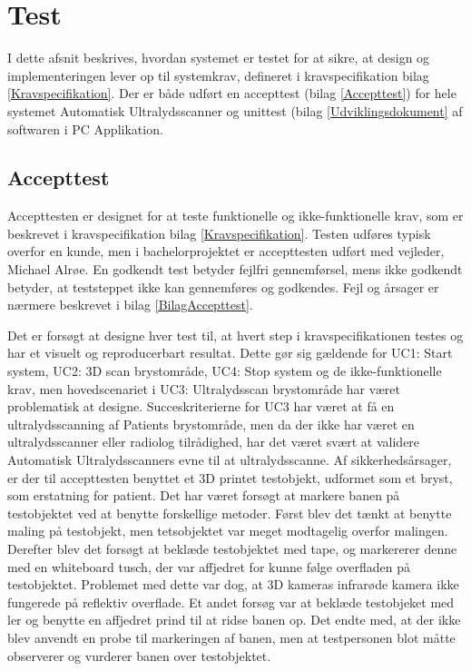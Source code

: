 \chapter{Test}\label{Test}
I dette afsnit beskrives, hvordan systemet er testet for at sikre, at design og implementeringen lever op til systemkrav, defineret i kravspecifikation bilag \ref{Kravspecifikation}. Der er både udført en accepttest (bilag \ref{Accepttest})  for hele systemet Automatisk Ultralydsscanner og unittest (bilag \ref{Udviklingsdokument} af softwaren i PC Applikation. 

\section{Accepttest}

Accepttesten er designet for at teste funktionelle og ikke-funktionelle krav, som er beskrevet i kravspecifikation bilag \ref{Kravspecifikation}. Testen udføres typisk overfor en kunde, men i bachelorprojektet er accepttesten udført med vejleder, Michael Alrøe. En godkendt test betyder fejlfri gennemførsel, mens ikke godkendt betyder, at teststeppet ikke kan gennemføres og godkendes. Fejl og årsager er nærmere beskrevet i bilag \ref{BilagAccepttest}.  

Det er forsøgt at designe hver test til, at hvert step i kravspecifikationen testes og har et visuelt og reproducerbart resultat. Dette gør sig gældende for UC1: Start system, UC2: 3D scan brystområde, UC4: Stop system og de ikke-funktionelle krav, men hovedscenariet i UC3: Ultralydsscan brystområde har været problematisk at designe. Succeskriterierne for UC3 har været at få en ultralydsscanning af Patients brystområde, men da der ikke har været en ultralydsscanner eller radiolog tilrådighed, har det været svært at validere Automatisk Ultralydsscanners evne til at ultralydsscanne. Af sikkerhedsårsager, er der til accepttesten benyttet et 3D printet testobjekt, udformet som et bryst, som erstatning for patient. Det har været forsøgt at markere banen på testobjektet ved at benytte forskellige metoder. Først blev det tænkt at benytte maling på testobjekt, men tetsobjektet var meget modtagelig overfor malingen. Derefter blev det forsøgt at beklæde testobjektet med tape, og markererer denne med en whiteboard tusch, der var affjedret for kunne følge overfladen på testobjektet. Problemet med dette var dog, at 3D kameras infrarøde kamera ikke fungerede på reflektiv overflade. Et andet forsøg var at beklæde testobjeket med ler og benytte en affjedret prind til at ridse banen op. Det endte med, at der ikke blev anvendt en probe til markeringen af banen, men at testpersonen blot måtte observerer og vurderer banen over testobjektet. 

